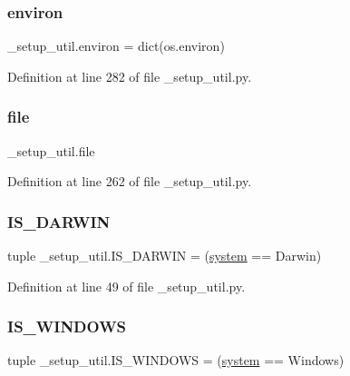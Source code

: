 \subsubsection{\texorpdfstring{environ}{environ}}
{\footnotesize\ttfamily \+\_\+setup\+\_\+util.\+environ = dict(os.\+environ)}



Definition at line 282 of file \+\_\+setup\+\_\+util.\+py.

\mbox{\label{namespace__setup__util_aea63a1b32cc79bc3d872ab7cb30dd07e}} 
\subsubsection{\texorpdfstring{file}{file}}
{\footnotesize\ttfamily \+\_\+setup\+\_\+util.\+file}



Definition at line 262 of file \+\_\+setup\+\_\+util.\+py.

\mbox{\label{namespace__setup__util_aecbb100ce6f94bb3c7e16d58fde05f96}} 
\subsubsection{\texorpdfstring{I\+S\+\_\+\+D\+A\+R\+W\+IN}{IS\_DARWIN}}
{\footnotesize\ttfamily tuple \+\_\+setup\+\_\+util.\+I\+S\+\_\+\+D\+A\+R\+W\+IN = (\hyperlink{namespace__setup__util_ae9fca6a80a6923f4580be72f68fee325}{system} == \textquotesingle{}Darwin\textquotesingle{})}



Definition at line 49 of file \+\_\+setup\+\_\+util.\+py.

\mbox{\label{namespace__setup__util_a6fe69c2dbd92959b6651a28cbb846e6e}} 
\subsubsection{\texorpdfstring{I\+S\+\_\+\+W\+I\+N\+D\+O\+WS}{IS\_WINDOWS}}
{\footnotesize\ttfamily tuple \+\_\+setup\+\_\+util.\+I\+S\+\_\+\+W\+I\+N\+D\+O\+WS = (\hyperlink{namespace__setup__util_ae9fca6a80a6923f4580be72f68fee325}{system} == \textquotesingle{}Windows\textquotesingle{})}



